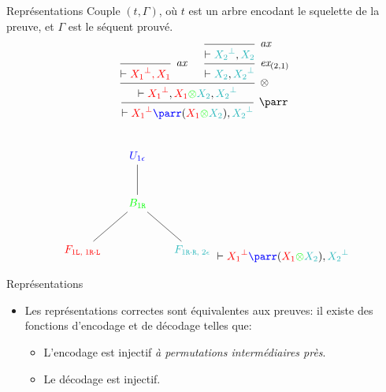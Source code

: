 \documentclass{beamer}
\newcommand*{\orth}{^\perp}
\newcommand*{\tensor}{\otimes}
\newcommand*{\axv}[1]{\infer{0}[\ensuremath{\mathit{ax}}]{\vdash #1}}
\newcommand*{\tensorv}[1]{\infer{2}[\ensuremath{\tensor}]{\vdash #1}}
\newcommand*{\parrv}[1]{\infer{1}[\ensuremath{\parr}]{\vdash #1}}
\newcommand*{\permv}[2]{\infer{1}[\ensuremath{\textit{ex}_{#1}}]{\vdash #2}}
\newcommand*{\sequent}{\Gamma}
\newcommand*{\Left}{\textnormal{\texttt{L}}}
\newcommand*{\Right}{\textnormal{\texttt{R}}}
\begin{document}
\begin{frame}{Représentations}
    Couple $(t, \sequent)$, où $t$ est un arbre encodant le squelette de la preuve, et $\sequent$ est le séquent prouvé.
    \begin{equation*}
    \begin{prooftree}
        \axv{\textcolor{red}{{X_1}\orth, X_1}}
        \axv{\textcolor{Aquamarine}{{X_2}\orth}, \textcolor{Aquamarine}{X_2}}
        \permv{(2, 1)}{\textcolor{Aquamarine}{X_2}, \textcolor{Aquamarine}{{X_2}\orth}}
        \tensorv{\textcolor{red}{{X_1}\orth}, \textcolor{red}{X_1} \textcolor{green}{\tensor} \textcolor{Aquamarine}{X_2}, \textcolor{Aquamarine}{{X_2}\orth}}
        \parrv{\textcolor{red}{\textcolor{red}{{X_1}\orth}} \textcolor{blue}{\parr} (\textcolor{red}{X_1} \textcolor{green}{\tensor} \textcolor{Aquamarine}{X_2}), \textcolor{Aquamarine}{{X_2}\orth}}
    \end{prooftree}
    \end{equation*}\\
    \begin{equation*}
    \begin{tikzpicture}%
        [level 2/.style={sibling distance=3.5cm}]
        \node {$\textcolor{blue}{U_{1 \epsilon}}$}
        child {node {$\textcolor{green}{B_{1 \Right}}$}
            child {node {$\textcolor{red}{F_{1 \Left, \; 1 \Right \cdot \Left}}$}}
            child {node {$\textcolor{Aquamarine}{F_{1 \Right \cdot \Right, \; 2 \epsilon}}$}}
        };
    \end{tikzpicture}\vdash \textcolor{red}{{X_1}\orth} \textcolor{blue}{\parr} (\textcolor{red}{X_1} \textcolor{green}{\tensor} \textcolor{Aquamarine}{X_2}), \textcolor{Aquamarine}{{X_2}\orth}
    \end{equation*}
\end{frame}

\begin{frame}{Représentations}
    \begin{itemize}
        \item Les représentations correctes sont équivalentes aux preuves: il existe des fonctions d'encodage et de décodage telles que:
            \begin{itemize}
                \item L'encodage est injectif \textit{à permutations intermédiaires près}.
                \item Le décodage est injectif.
            \end{itemize}
    \end{itemize}
\end{frame}
\end{document}
